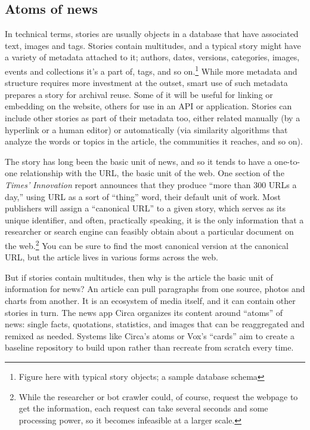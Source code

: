 \subsection{Atoms of news}

In technical terms, stories are usually objects in a database that have associated text, images and tags. Stories contain multitudes, and a typical story might have a variety of metadata attached to it; authors, dates, versions, categories, images, events and collections it's a part of, tags, and so on.\footnote{Figure here with typical story objects; a sample database schema} While more metadata and structure requires more investment at the outset, smart use of such metadata prepares a story for archival reuse. Some of it will be useful for linking or embedding on the website, others for use in an API or application. Stories can include other stories as part of their metadata too, either related manually (by a hyperlink or a human editor) or automatically (via similarity algorithms that analyze the words or topics in the article, the communities it reaches, and so on).


The story has long been the basic unit of news, and so it tends to have a one-to-one relationship with the URL, the basic unit of the web. One section of the \emph{Times'} \emph{Innovation} report announces that they produce ``more than 300 URLs a day,'' using URL as a sort of ``thing'' word, their default unit of work.\autocite[27]{_innovation_2014} Most publishers will assign a ``canonical URL'' to a given story, which serves as its unique identifier, and often, practically speaking, it is the only information that a researcher or search engine can feasibly obtain about a particular document on the web.\footnote{While the researcher or bot crawler could, of course, request the webpage to get the information, each request can take several seconds and some processing power, so it becomes infeasible at a larger scale.} You can be sure to find the most canonical version at the canonical URL, but the article lives in various forms across the web.

But if stories contain multitudes, then why is the article the basic unit of information for news? An article can pull paragraphs from one source, photos and charts from another. It is an ecosystem of media itself, and it can contain other stories in turn. The news app Circa organizes its content around ``atoms'' of news: single facts, quotations, statistics, and images that can be reaggregated and remixed as needed. Systems like Circa's atoms or Vox's ``cards'' aim to create a baseline repository to build upon rather than recreate from scratch every time.

